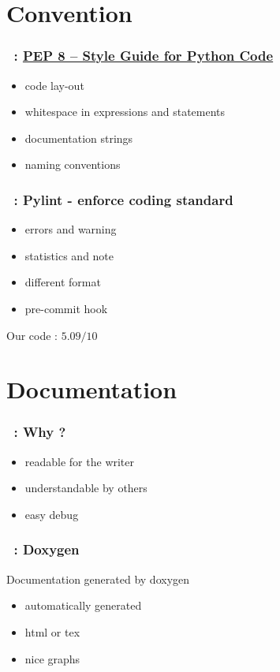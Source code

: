 \documentclass[a4paper, 11pt]{beamer}
\begin{document}
\section{Convention}
\begin{frame}
    \frametitle{\secname~: \href{https://www.python.org/dev/peps/pep-0008/}{PEP 8 -- Style Guide for Python Code}}
    \begin{itemize}
        \item code lay-out
        \item whitespace in expressions and statements
        \item documentation strings
        \item naming conventions
    \end{itemize}
\end{frame}

\begin{frame}
    \frametitle{\secname~: Pylint - enforce coding standard}
    \begin{itemize}
        \item errors and warning
        \item statistics and note 
        \item different format
        \item pre-commit hook 
    \end{itemize}  
    Our code : $5.09/10$
\end{frame}

\section{Documentation}
\begin{frame}
    \frametitle{\secname~: Why ?}
    \begin{itemize}
        \item readable for the writer
        \item understandable by others 
        \item easy debug
    \end{itemize}
\end{frame}

\begin{frame}
    \frametitle{\secname~: Doxygen}
    Documentation generated by doxygen
    \begin{itemize}
    	\item automatically generated
        \item html or tex
        \item nice graphs
    \end{itemize}
\end{frame}
\end{document}
